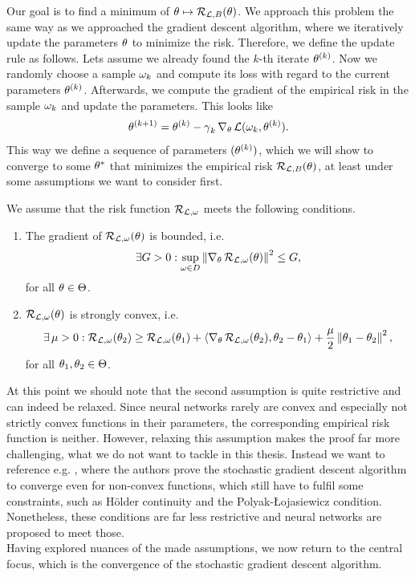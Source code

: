 Our goal is to find a minimum of $\theta \mapsto\operatorname{\mathcal{R}}_{\operatorname{\mathcal{L}},B} (\theta)$. We approach this problem the same way as we approached the gradient descent algorithm, where we iteratively update the parameters $\theta$ to minimize the risk. Therefore, we define the update rule as follows. Lets assume we already found the $k$-th iterate $\theta^{(k)}$. Now we randomly choose a sample $\omega_k$ and compute its loss with regard to the current parameters $\theta^{(k)}$. Afterwards, we compute the gradient of the empirical risk in the sample $\omega_k$ and update the parameters. This looks like
\begin{align}\label{eq:sgd}
\theta^{(k+1)} = \theta^{(k)} -\operatorname{\gamma}_k \nabla_{\theta} \operatorname{\mathcal{L}}(\omega_k,\theta^{(k)}).
\end{align}
This way we define a sequence of parameters $(\theta^{(k)})$, which we will show to converge to some $\theta^{\ast}$ that minimizes the empirical risk $\operatorname{\mathcal{R}}_{\operatorname{\mathcal{L}},B}(\theta)$, at least under some assumptions we want to consider first.
\begin{assumption}\label{ass:sgd}
We assume that the risk function $\operatorname{\mathcal{R}}_{\operatorname{\mathcal{L}},\omega}$ meets the following conditions.
\begin{enumerate}
\item The gradient of $\operatorname{\mathcal{R}}_{\operatorname{\mathcal{L}},\omega}(\theta)$ is bounded, i.e.
\begin{align}\label{eq:ass1}
\exists G > 0: \sup_{\omega\in D} \left\| \nabla_{\theta} \operatorname{\mathcal{R}}_{\operatorname{\mathcal{L}},\omega}(\theta) \right\|^2 \leq G,
\end{align}
for all $\theta\in\operatorname{\Theta}$.
\item $\operatorname{\mathcal{R}}_{\operatorname{\mathcal{L}},\omega}(\theta)$ is strongly convex, i.e.
\begin{align}\label{eq:ass2}
\exists \operatorname{\mu}>0: \operatorname{\mathcal{R}}_{\operatorname{\mathcal{L}},\omega}(\theta_2) \geq \operatorname{\mathcal{R}}_{\operatorname{\mathcal{L}},\omega}(\theta_1) + \left\langle \nabla_{\theta} \operatorname{\mathcal{R}}_{\operatorname{\mathcal{L}},\omega}(\theta_2), \theta_2-\theta_1 \right\rangle + \frac{\operatorname{\mu}}{2} \left\| \theta_1 - \theta_2 \right\|^2,
\end{align}
for all $\theta_1,\theta_2 \in\operatorname{\Theta}$.
\end{enumerate}
\end{assumption}
At this point we should note that the second assumption is quite restrictive and can indeed be relaxed. Since neural networks rarely are convex and especially not strictly convex functions in their parameters, the corresponding empirical risk function is neither. However, relaxing this assumption makes the proof far more challenging, what we do not want to tackle in this thesis. Instead we want to reference e.g. \cite{lei2019stochastic}, where the authors prove the stochastic gradient descent algorithm to converge even for non-convex functions, which still have to fulfil some constraints, such as Hölder continuity and the Polyak-\L{}ojasiewicz condition. Nonetheless, these conditions are far less restrictive and neural networks are proposed to meet those.\\
Having explored nuances of the made assumptions, we now return to the central focus, which is the convergence of the stochastic gradient descent algorithm.

